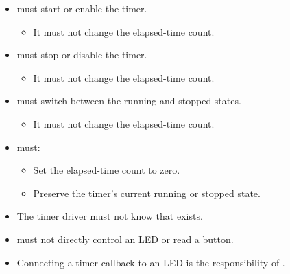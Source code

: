 \begin{itemize}
  \item {} must start or enable the timer.
  \begin{itemize}
    \item It must not change the elapsed-time count.
  \end{itemize}
  \item {} must stop or disable the timer.
  \begin{itemize}
    \item It must not change the elapsed-time count.
  \end{itemize}
  \item {} must switch between the running and stopped states.
  \begin{itemize}
    \item It must not change the elapsed-time count.
  \end{itemize}
  \item {} must:
  \begin{itemize}
    \item Set the elapsed-time count to zero.
    \item Preserve the timer's current running or stopped state.
  \end{itemize}
\end{itemize}

\begin{itemize}
  \item The timer driver must not know that  exists.
  \item {} must not directly control an LED or read a button.
  \item Connecting a timer callback to an LED is the responsibility of .
\end{itemize}

